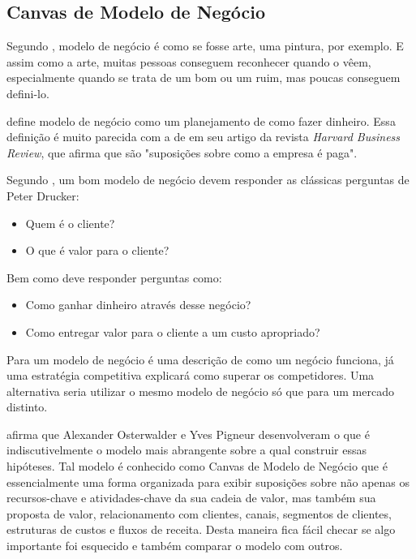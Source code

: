 \subsection{Canvas de Modelo de Negócio}
\label{cha:canvas_de_modelo_de_negocio}
Segundo , modelo de negócio é como se fosse arte, uma pintura, por exemplo. E assim como a arte, muitas pessoas conseguem reconhecer quando o vêem, especialmente quando se trata de um bom ou um ruim, mas poucas conseguem defini-lo.

 define modelo de negócio como um planejamento de como fazer dinheiro. Essa definição é muito parecida com a de  em seu artigo da revista \textit{Harvard Business Review}, que afirma que são "suposições sobre como a empresa é paga".

Segundo , um bom modelo de negócio devem responder as clássicas perguntas de Peter Drucker:
\begin{itemize}
\item Quem é o cliente?
\item O que é valor para o cliente?
\end{itemize}
Bem como deve responder perguntas como:
\begin{itemize}
\item Como ganhar dinheiro através desse negócio?
\item Como entregar valor para o cliente a um custo apropriado?
\end{itemize}

Para  um modelo de negócio é uma descrição de como um negócio funciona, já uma estratégia competitiva explicará como superar os competidores. Uma alternativa seria utilizar o mesmo modelo de negócio só que para um mercado distinto.

 afirma que Alexander Osterwalder e Yves Pigneur desenvolveram o que é indiscutivelmente o modelo mais abrangente sobre a qual construir essas hipóteses. Tal modelo é conhecido como Canvas de Modelo de Negócio que é essencialmente uma forma organizada para exibir suposições sobre não apenas os recursos-chave e atividades-chave da sua cadeia de valor, mas também sua proposta de valor, relacionamento com clientes, canais, segmentos de clientes, estruturas de custos e fluxos de receita. Desta maneira fica fácil checar se algo importante foi esquecido e também  comparar o modelo com outros.

